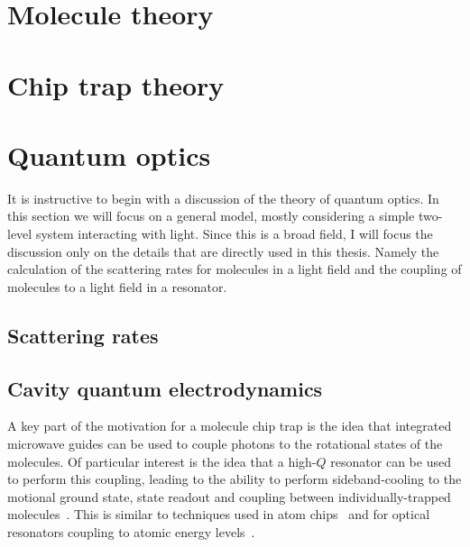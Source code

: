 
\section{Molecule theory}
\label{theory:molecules}


\section{Chip trap theory}


\section{Quantum optics}

It is instructive to begin with a discussion of the theory of quantum optics.
In this section we will focus on a general model, mostly considering a simple
two-level system interacting with light. Since this is a broad field, I will
focus the discussion only on the details that are directly used in this thesis.
Namely the calculation of the scattering rates for molecules in a light field
and the coupling of molecules to a light field in a resonator.


\subsection{Scattering rates}


\subsection{Cavity quantum electrodynamics}

A key part of the motivation for a molecule chip trap is the idea that
integrated microwave guides can be used to couple photons to the rotational
states  of the molecules. Of particular interest is the idea
that a high-$Q$ resonator can be used to perform this coupling, leading to the
ability to perform sideband-cooling to the motional ground state, state readout
and coupling between individually-trapped molecules~\cite{Andre2006}. This is
similar to techniques used in atom chips~\cite{Treutlein2008} and for optical
resonators coupling to atomic energy levels~\cite{}.

